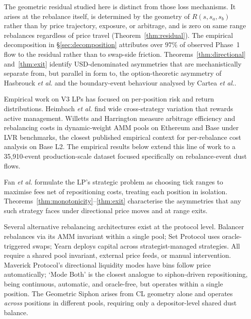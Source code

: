 \documentclass{manuscript}
\begin{document}
The geometric residual studied here is distinct from those loss mechanisms. It arises at the rebalance itself, is determined by the geometry of $R(s, s_a, s_b)$ rather than by price trajectory, exposure, or arbitrage, and is zero on same range rebalances regardless of price travel (Theorem~\ref{thm:residual}). The empirical decomposition in \S\ref{sec:decomposition} attributes over $97\%$ of observed Phase~1 flow to the residual rather than to swap-side friction. Theorems~\ref{thm:directional} and~\ref{thm:exit} identify USD-denominated asymmetries that are mechanistically separate from, but parallel in form to, the option-theoretic asymmetry of Hasbrouck \emph{et al.}\cite{hasbrouck2025} and the boundary-event behaviour analysed by Cartea \emph{et al.}\cite{cartea2024}.

Empirical work on V3 LPs has focused on per-position risk and return distributions. Heimbach \emph{et al.}\cite{heimbach2022} find wide cross-strategy variation that rewards active management. Willetts and Harrington\cite{willetts2026} measure arbitrage efficiency and rebalancing costs in dynamic-weight AMM pools on Ethereum and Base under LVR benchmarks, the closest published empirical context for per-rebalance cost analysis on Base L2. The empirical results below extend this line of work to a 35{,}910-event production-scale dataset focused specifically on rebalance-event dust flows.

Fan \emph{et al.}\cite{fan2023} formulate the LP's strategic problem as choosing tick ranges to maximise fees net of repositioning costs, treating each position in isolation. Theorems~\ref{thm:monotonicity}--\ref{thm:exit} characterise the asymmetries that any such strategy faces under directional price moves and at range exits.

Several alternative rebalancing architectures exist at the protocol level. Balancer\cite{martinelli2019} rebalances via its AMM invariant within a single pool; Set Protocol uses oracle-triggered swaps; Yearn deploys capital across strategist-managed strategies. All require a shared pool invariant, external price feeds, or manual intervention. Maverick Protocol's directional liquidity modes\cite{maverick2023} have bins follow price automatically; `Mode Both' is the closest analogue to siphon-driven repositioning, being continuous, automatic, and oracle-free, but operates within a single position. The Geometric Siphon arises from CL geometry alone and operates \emph{across} positions in different pools, requiring only a depositor-level shared dust balance.
\end{document}
